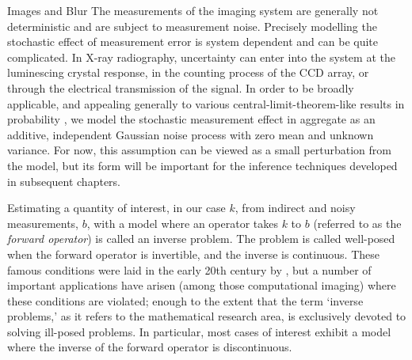 \begin{chapter}{Images and Blur}
  The measurements of the imaging system are generally not deterministic and are subject to measurement noise.
  Precisely modelling the stochastic effect of measurement error is system dependent and can be quite complicated.
  In X-ray radiography, uncertainty can enter into the system at the luminescing crystal response, in the counting process of the CCD array, or through the electrical transmission of the signal.
  In order to be broadly applicable, and appealing generally to various central-limit-theorem-like results in probability \citep{durrett2010probability}, we model the stochastic measurement effect in aggregate as an additive, independent Gaussian noise process with zero mean and unknown variance.  
  For now, this assumption can be viewed as a small perturbation from the model, but its form will be important for the inference techniques developed in subsequent chapters.

  Estimating a quantity of interest, in our case $k$, from indirect and noisy measurements, $b$, with a model where an operator takes $k$ to $b$ (referred to as the \emph{forward operator}) is called an inverse problem.  
  The problem is called well-posed when the forward operator is invertible, and the inverse is continuous. %
  These famous conditions were laid in the early 20th century by \citep{hadamard1902}, but a number of important applications have arisen (among those computational imaging) where these conditions are violated; enough to the extent that the term `inverse problems,' as it refers to the mathematical research area, is exclusively devoted to solving ill-posed problems.
  In particular, most cases of interest %
  exhibit a model where the inverse of the forward operator is discontinuous.


\end{chapter}
